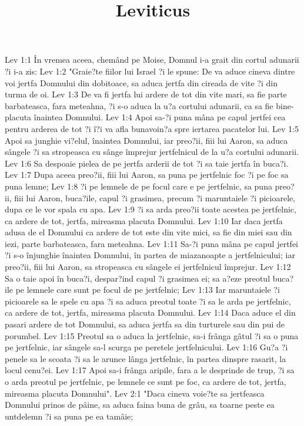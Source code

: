 

\title{Leviticus}

Lev 1:1  În vremea aceea, chemând pe Moise, Domnul i-a grait din cortul adunarii ?i i-a zis:
Lev 1:2  "Graie?te fiilor lui Israel ?i le spune: De va aduce cineva dintre voi jertfa Domnului din dobitoace, sa aduca jertfa din cireada de vite ?i din turma de oi.
Lev 1:3  De va fi jertfa lui ardere de tot din vite mari, sa fie parte barbateasca, fara meteahna, ?i s-o aduca la u?a cortului adunarii, ca sa fie bine-placuta înaintea Domnului.
Lev 1:4  Apoi sa-?i puna mâna pe capul jertfei cea pentru arderea de tot ?i î?i va afla bunavoin?a spre iertarea pacatelor lui.
Lev 1:5  Apoi sa junghie vi?elul, înaintea Domnului, iar preo?ii, fiii lui Aaron, sa aduca sângele ?i sa stropeasca cu sânge împrejur jertfelnicul de la u?a cortului adunarii.
Lev 1:6  Sa despoaie pielea de pe jertfa arderii de tot ?i sa taie jertfa în buca?i.
Lev 1:7  Dupa aceea preo?ii, fiii lui Aaron, sa puna pe jertfelnic foc ?i pe foc sa puna lemne;
Lev 1:8  ?i pe lemnele de pe focul care e pe jertfelnic, sa puna preo?ii, fiii lui Aaron, buca?ile, capul ?i grasimea, precum ?i maruntaiele ?i picioarele, dupa ce le vor spala cu apa.
Lev 1:9  ?i sa arda preo?ii toate acestea pe jertfelnic, ca ardere de tot, jertfa, mireasma placuta Domnului.
Lev 1:10  Iar daca jertfa adusa de el Domnului ca ardere de tot este din vite mici, sa fie din miei sau din iezi, parte barbateasca, fara meteahna.
Lev 1:11  Sa-?i puna mâna pe capul jertfei ?i s-o înjunghie înaintea Domnului, în partea de miazanoapte a jertfelnicului; iar preo?ii, fiii lui Aaron, sa stropeasca cu sângele ei jertfelnicul împrejur.
Lev 1:12  Sa o taie apoi în buca?i, despar?ind capul ?i grasimea ei; sa a?eze preotul buca?ile pe lemnele care sunt pe focul de pe jertfelnic;
Lev 1:13  Iar maruntaiele ?i picioarele sa le spele cu apa ?i sa aduca preotul toate ?i sa le arda pe jertfelnic, ca ardere de tot, jertfa, mireasma placuta Domnului.
Lev 1:14  Daca aduce el din pasari ardere de tot Domnului, sa aduca jertfa sa din turturele sau din pui de porumbel.
Lev 1:15  Preotul sa o aduca la jertfelnic, sa-i frânga gâtul ?i sa o puna pe jertfelnic, iar sângele sa-l scurga pe peretele jertfelnicului.
Lev 1:16  Gu?a ?i penele sa le scoata ?i sa le arunce lânga jertfelnic, în partea dinspre rasarit, la locul cenu?ei.
Lev 1:17  Apoi sa-i frânga aripile, fara a le desprinde de trup, ?i sa o arda preotul pe jertfelnic, pe lemnele ce sunt pe foc, ca ardere de tot, jertfa, mireasma placuta Domnului".
Lev 2:1  "Daca cineva voie?te sa jertfeasca Domnului prinos de pâine, sa aduca faina buna de grâu, sa toarne peste ea untdelemn ?i sa puna pe ea tamâie;
